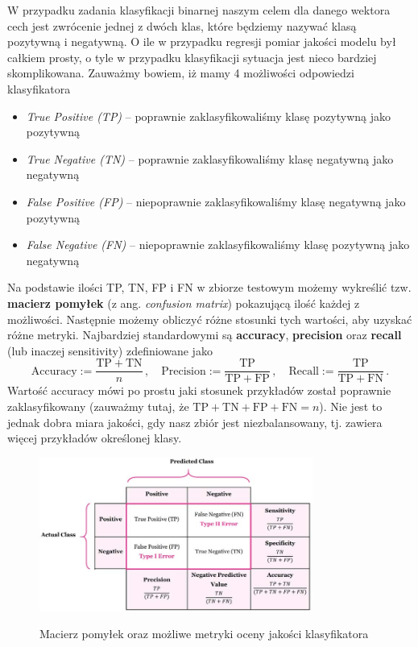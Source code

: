 \documentclass{myclass}
\numberwithin{equation}{section}
\begin{document}
W przypadku zadania klasyfikacji binarnej naszym celem dla danego wektora cech jest zwrócenie jednej
z dwóch klas, które będziemy nazywać klasą pozytywną i negatywną. O ile w przypadku regresji pomiar
jakości modelu był całkiem prosty, o tyle w przypadku klasyfikacji sytuacja jest nieco bardziej
skomplikowana. Zauważmy bowiem, iż mamy 4 możliwości odpowiedzi klasyfikatora
\begin{itemize}

    \item \textit{True Positive (TP)} -- poprawnie zaklasyfikowaliśmy klasę pozytywną jako pozytywną
    
    \item \textit{True Negative (TN)} -- poprawnie zaklasyfikowaliśmy klasę negatywną jako negatywną

    \item \textit{False Positive (FP)} -- niepoprawnie zaklasyfikowaliśmy klasę negatywną jako
    pozytywną

    \item \textit{False Negative (FN)} -- niepoprawnie zaklasyfikowaliśmy klasę pozytywną jako
    negatywną
    
\end{itemize}

Na podstawie ilości TP, TN, FP i FN w zbiorze testowym możemy wykreślić tzw. \textbf{macierz
pomyłek} (z ang. \textit{confusion matrix}) pokazującą ilość każdej z możliwości. Następnie możemy
obliczyć różne stosunki tych wartości, aby uzyskać różne metryki. Najbardziej standardowymi są
\textbf{accuracy}, \textbf{precision} oraz \textbf{recall} (lub inaczej sensitivity) zdefiniowane
jako
\begin{equation}
    \mathrm{Accuracy} := \frac{\mathrm{TP} + \mathrm{TN}}{n}\,,\quad\mathrm{Precision} := \frac{\mathrm{TP}}{\mathrm{TP} + \mathrm{FP}}\,,\quad\mathrm{Recall} := \frac{\mathrm{TP}}{\mathrm{TP} + \mathrm{FN}}\,.
\end{equation}
Wartość accuracy mówi po prostu jaki stosunek przykładów został poprawnie zaklasyfikowany (zauważmy
tutaj, że \(\mathrm{TP + TN + FP + FN} = n\)). Nie jest to jednak dobra miara jakości, gdy nasz
zbiór jest niezbalansowany, tj. zawiera więcej przykładów określonej klasy.

\begin{figure}[ht]
    \centering
    \includegraphics[width=0.8\textwidth]{figs/confusionMatrix.jpg}
    \label{fig:confusionMatrix}
    \caption{Macierz pomyłek oraz możliwe metryki oceny jakości klasyfikatora}
\end{figure}
\end{document}
